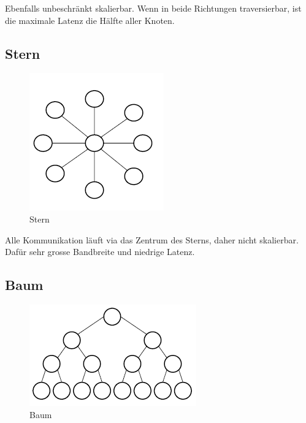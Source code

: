 Ebenfalls unbeschränkt skalierbar. Wenn in beide Richtungen traversierbar, ist die maximale Latenz die Hälfte aller Knoten.

\subsection{Stern}
 

\begin{figure}
\centering
\includegraphics[width=0.7\linewidth]{fig/stern}
\caption{Stern}
\label{fig:stern}
\end{figure}

Alle Kommunikation läuft via das Zentrum des Sterns, daher nicht skalierbar. Dafür sehr grosse Bandbreite und niedrige Latenz.

\subsection{Baum}

\begin{figure}
\centering
\includegraphics[width=0.7\linewidth]{fig/baum}
\caption{Baum}
\label{fig:baum}
\end{figure}

